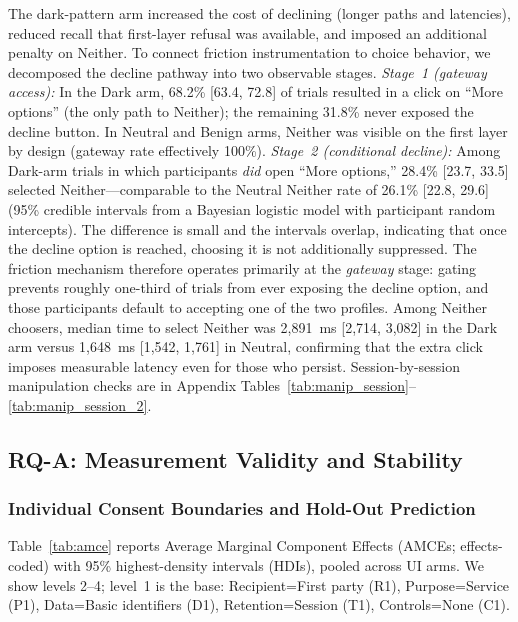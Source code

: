 \documentclass{eusset}
\begin{document}
\noindent The dark-pattern arm increased the cost of declining (longer paths and latencies), reduced recall that first-layer refusal was available, and imposed an additional penalty on Neither. To connect friction instrumentation to choice behavior, we decomposed the decline pathway into two observable stages. \emph{Stage~1 (gateway access):} In the Dark arm, 68.2\% [63.4, 72.8] of trials resulted in a click on ``More options'' (the only path to Neither); the remaining 31.8\% never exposed the decline button. In Neutral and Benign arms, Neither was visible on the first layer by design (gateway rate effectively 100\%). \emph{Stage~2 (conditional decline):} Among Dark-arm trials in which participants \emph{did} open ``More options,'' 28.4\% [23.7, 33.5] selected Neither---comparable to the Neutral Neither rate of 26.1\% [22.8, 29.6] (95\% credible intervals from a Bayesian logistic model with participant random intercepts). The difference is small and the intervals overlap, indicating that once the decline option is reached, choosing it is not additionally suppressed. The friction mechanism therefore operates primarily at the \emph{gateway} stage: gating prevents roughly one-third of trials from ever exposing the decline option, and those participants default to accepting one of the two profiles. Among Neither choosers, median time to select Neither was 2{,}891~ms [2{,}714, 3{,}082] in the Dark arm versus 1{,}648~ms [1{,}542, 1{,}761] in Neutral, confirming that the extra click imposes measurable latency even for those who persist. Session-by-session manipulation checks are in Appendix Tables~\ref{tab:manip_session}--\ref{tab:manip_session_2}.

\subsection{RQ-A: Measurement Validity and Stability}
\subsubsection{Individual Consent Boundaries and Hold-Out Prediction}
Table~\ref{tab:amce} reports Average Marginal Component Effects (AMCEs; effects-coded) with 95\% highest-density intervals (HDIs), pooled across UI arms. We show levels 2--4; level~1 is the base: Recipient=First party (R1), Purpose=Service (P1), Data=Basic identifiers (D1), Retention=Session (T1), Controls=None (C1).
\end{document}
